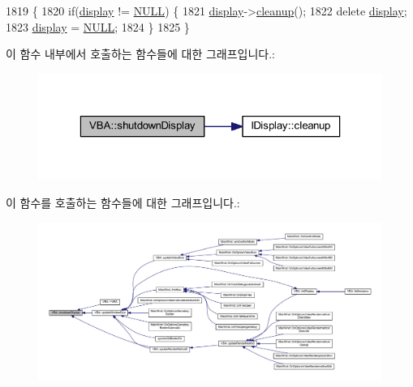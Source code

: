 \begin{DoxyCode}
1819 \{
1820   \textcolor{keywordflow}{if}(\mbox{\hyperlink{class_v_b_a_a940e5bad8b3ed2436888dbcd03bfd563}{display}} != \mbox{\hyperlink{getopt1_8c_a070d2ce7b6bb7e5c05602aa8c308d0c4}{NULL}}) \{
1821     \mbox{\hyperlink{class_v_b_a_a940e5bad8b3ed2436888dbcd03bfd563}{display}}->\mbox{\hyperlink{class_i_display_a039e8c6b3f8fbee485fb895ef70e72c0}{cleanup}}();
1822     \textcolor{keyword}{delete} \mbox{\hyperlink{class_v_b_a_a940e5bad8b3ed2436888dbcd03bfd563}{display}};
1823     \mbox{\hyperlink{class_v_b_a_a940e5bad8b3ed2436888dbcd03bfd563}{display}} = \mbox{\hyperlink{getopt1_8c_a070d2ce7b6bb7e5c05602aa8c308d0c4}{NULL}};
1824   \}
1825 \}
\end{DoxyCode}
이 함수 내부에서 호출하는 함수들에 대한 그래프입니다.\+:
\nopagebreak
\begin{figure}[H]
\begin{center}
\leavevmode
\includegraphics[width=323pt]{class_v_b_a_ac71d70eba3bf4229255b6aeeea9573e5_cgraph}
\end{center}
\end{figure}
이 함수를 호출하는 함수들에 대한 그래프입니다.\+:
\nopagebreak
\begin{figure}[H]
\begin{center}
\leavevmode
\includegraphics[width=350pt]{class_v_b_a_ac71d70eba3bf4229255b6aeeea9573e5_icgraph}
\end{center}
\end{figure}
\mbox{\label{class_v_b_a_afbe0e6f9458f25adb848516537a91747}} 
